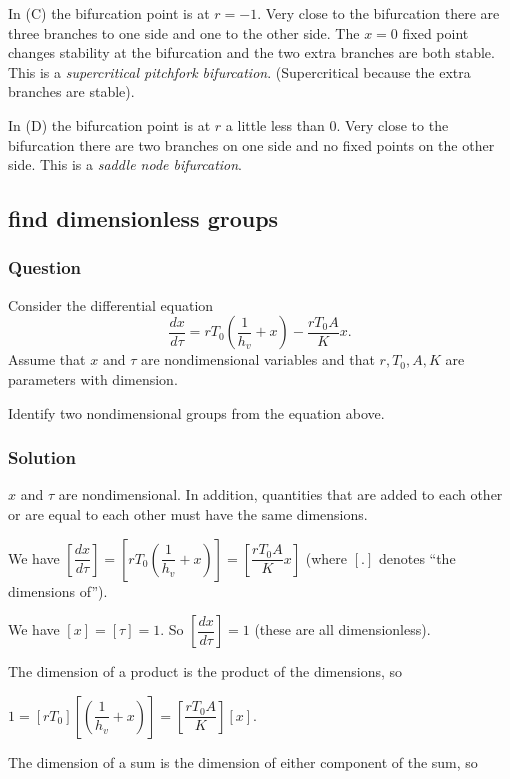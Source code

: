 \documentclass[12pt,letterpaper,noanswers]{exam}
\begin{document}
In (C) the bifurcation point is at $r = -1$.  Very close to the bifurcation there are three branches to one side and one to the other side.  The $x=0$ fixed point changes stability at the bifurcation and the two extra branches are both stable.  This is a \emph{supercritical pitchfork bifurcation}.  (Supercritical because the extra branches are stable).

In (D) the bifurcation point is at $r$ a little less than $0$.  Very close to the bifurcation there are two branches on one side and no fixed points on the other side.  This is a \emph{saddle node bifurcation}.


\subsection{find dimensionless groups}
\subsubsection{Question}


Consider the differential equation \[\frac{dx}{d\tau} = r T_0\left(\frac{1}{h_v}+ x\right)- \frac{r T_0 A}{K} x.\]
Assume that $x$ and $\tau$ are nondimensional variables and that $r, T_0, A, K$ are parameters with dimension.

Identify two nondimensional groups from the equation above.


\subsubsection{Solution}


 $x$ and $\tau$ are nondimensional.  In addition, quantities that are added to each other or are equal to each other must have the same dimensions.

We have $\left[\dfrac{dx}{d\tau}\right] = \left[r T_0\left(\dfrac{1}{h_v}+ x\right)\right] = \left[\dfrac{r T_0 A}{K} x\right]$ (where $\left[ . \right]$ denotes ``the dimensions of'').

We have $\left[x \right] = \left[\tau\right] = 1$.  So $\left[\dfrac{dx}{d\tau}\right] = 1$ (these are all dimensionless).

The dimension of a product is the product of the dimensions, so

$1 = \left[r T_0\right]\left[\left(\dfrac{1}{h_v}+ x\right)\right] = \left[\dfrac{r T_0 A}{K}\right]\left[ x\right]$.

The dimension of a sum is the dimension of either component of the sum, so
\end{document}
